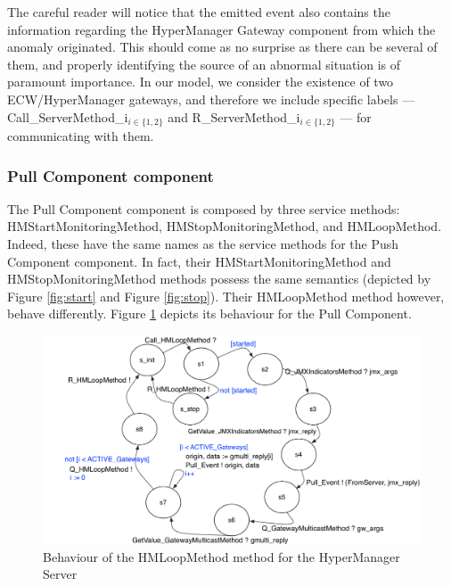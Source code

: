   \noindent The careful reader will notice that the emitted event also contains
   the information regarding the \textsf{HyperManager Gateway} component from which 
   the anomaly originated. This should come as no surprise as there can be
   several of them, and properly identifying the source of an abnormal situation 
   is of paramount importance. In our model, we consider the existence of two 
   \ac{ECW}/HyperManager gateways, and therefore we include specific labels
   --- \textsf{Call\_ServerMethod\_i}$_{i\in\{1,2\}}$ and  \textsf{R\_ServerMethod\_i}$_{i\in\{1,2\}}$ --- 
	for  communicating with them.
  
  
\subsubsection{\textsf{Pull Component} component}		  
  		
	
	The \textsf{Pull Component} component is composed by three service methods: \textsf{HMStartMonitoringMethod},
	\textsf{HMStopMonitoringMethod}, and \textsf{HMLoopMethod}. Indeed, these have the same names as the service methods
	for the \textsf{Push Component} component. In fact, their \textsf{HMStartMonitoringMethod} and 
	\textsf{HMStopMonitoringMethod} methods possess the same semantics (depicted by Figure \ref{fig:start} 
	and Figure \ref{fig:stop}). Their \textsf{HMLoopMethod} method however, behave differently.
    Figure \ref{fig:LS} depicts its behaviour for the \textsf{Pull Component}.

	\begin{figure}[H]
	\centering
		\includegraphics[scale=0.5]{figures/chapter3/HMLoopMethodatServer2.pdf}
		\caption{Behaviour of the HMLoopMethod method for the HyperManager Server}
		\label{fig:LS}		
	\end{figure}	  

